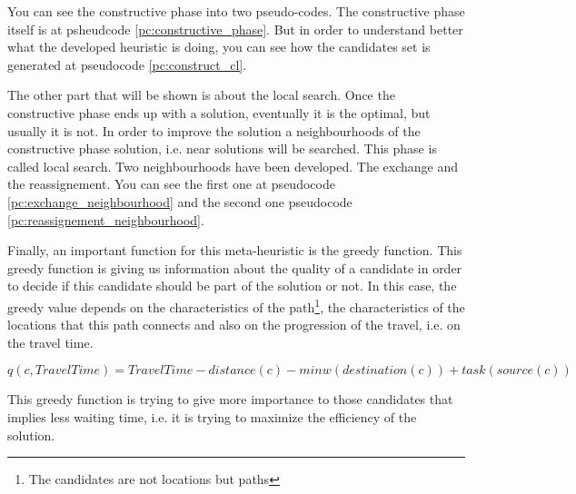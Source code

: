 \documentclass[]{report}
\begin{document}
You can see the constructive phase into two pseudo-codes. The constructive phase itself is at psheudcode \ref{pc:constructive_phase}. But in order to understand better what the developed heuristic is doing, you can see how the candidates set is generated at pseudocode \ref{pc:construct_cl}.

The other part that will be shown is about the local search. Once the constructive phase ends up with a solution, eventually it is the optimal, but usually it is not. In order to improve the solution a neighbourhoods of the constructive phase solution, i.e. near solutions will be searched. This phase is called local search. Two neighbourhoods have been developed. The exchange and the reassignement. You can see the first one at pseudocode \ref{pc:exchange_neighbourhood} and the second one pseudocode \ref{pc:reassignement_neighbourhood}.

Finally, an important function for this meta-heuristic is the greedy function. This greedy function is giving us information about the quality of a candidate in order to decide if this candidate should be part of the solution or not. In this case, the greedy value depends on the characteristics of the path\footnote{The candidates are not locations but paths}, the characteristics of the locations that this path connects and also on the progression of the travel, i.e. on the travel time. 

$$ q(c, TravelTime) = TravelTime - distance(c) - minw(destination(c)) + task(source(c))$$

This greedy function is trying to give more importance to those candidates that implies less waiting time, i.e. it is trying to maximize the efficiency of the solution.
\end{document}
